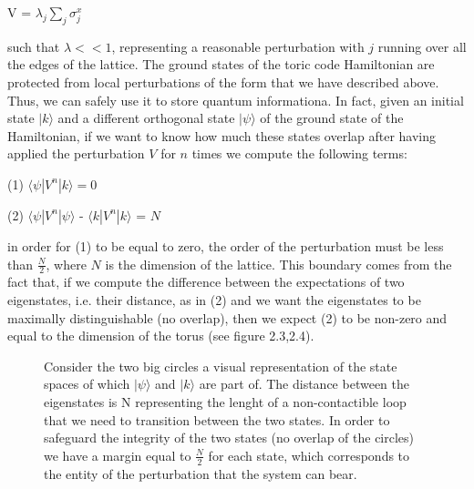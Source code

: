 \documentclass{Configuration_Files/PoliMi3i_thesis}
\begin{document}
\begin{center}
	V = $\lambda_j \sum_{j} \sigma^x_j $
\end{center}

such that $\lambda << 1 $, representing a reasonable perturbation with $j$ running over all the edges of the lattice. The ground states of the toric code Hamiltonian are protected from local perturbations of the form that we have described above. Thus, we can safely use it to store quantum informationa. In fact, given an initial state $ |k \rangle $ and  a different orthogonal state $ |\psi \rangle $ of the ground state of the Hamiltonian, if we want to know how much these states overlap after having applied the perturbation $V$ for $n$ times we compute the following terms:

\begin{center}
	 (1) $ \langle \psi|V^n| k \rangle=0$                                         
\end{center}
\begin{center}
     (2) $ \langle \psi|V^n| \psi \rangle$ - $ \langle k|V^n| k \rangle$ = $N$  
\end{center}

in order for (1) to be equal to zero, the order of the perturbation must be less than $ \frac{N}{2}$, where $N$ is the dimension of the lattice. 
This boundary comes from the fact that, if we compute the difference between the expectations of two eigenstates, i.e. their distance, as in (2) and we want the eigenstates to be maximally distinguishable (no overlap), then we expect (2) to be non-zero and equal to the dimension of the torus (see figure 2.3,2.4). 

\begin{figure}
	\begin{center}
		
		
	\end{center}
	\caption{Consider the two big circles a visual representation of the state spaces of which $|\psi\rangle$ and $|k\rangle$ are part of. The distance between the eigenstates is N representing the lenght of a non-contactible loop that we need to transition between the two states. In order to safeguard the integrity of the two states (no overlap of the circles) we have a margin equal to $\frac{N}{2}$ for each state, which corresponds to the entity of the perturbation that the system can bear. }
	\label{fig:QEC}
\end{figure}
\end{document}
